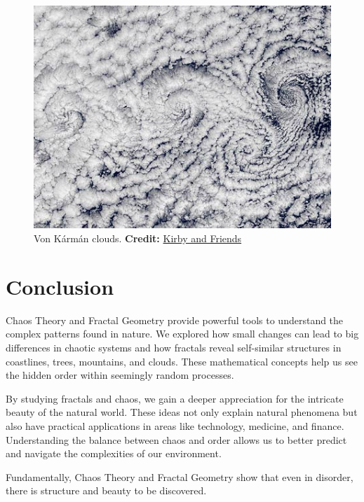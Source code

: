 \documentclass[12pt]{article}
\begin{document}
\begin{figure}[H]
\centering
\includegraphics[width=\textwidth]{assets/vonkarman-clouds.jpg}
\caption{Von Kármán clouds. \textbf{Credit:} \href{https://kirbyandfriends.wordpress.com/wp-content/uploads/2011/02/vonkarman_clouds_1.jpg}{Kirby and Friends}}
\label{fig:vonkarman-clouds}
\end{figure}

\newpage

\section{Conclusion}
Chaos Theory and Fractal Geometry provide powerful tools to understand the complex patterns found in nature. We explored how small changes can lead to big differences in chaotic systems and how fractals reveal self-similar structures in coastlines, trees, mountains, and clouds. These mathematical concepts help us see the hidden order within seemingly random processes.

By studying fractals and chaos, we gain a deeper appreciation for the intricate beauty of the natural world. These ideas not only explain natural phenomena but also have practical applications in areas like technology, medicine, and finance. Understanding the balance between chaos and order allows us to better predict and navigate the complexities of our environment.

Fundamentally, Chaos Theory and Fractal Geometry show that even in disorder, there is structure and beauty to be discovered.

\newpage

\nocite{*} 
 

\end{document}
